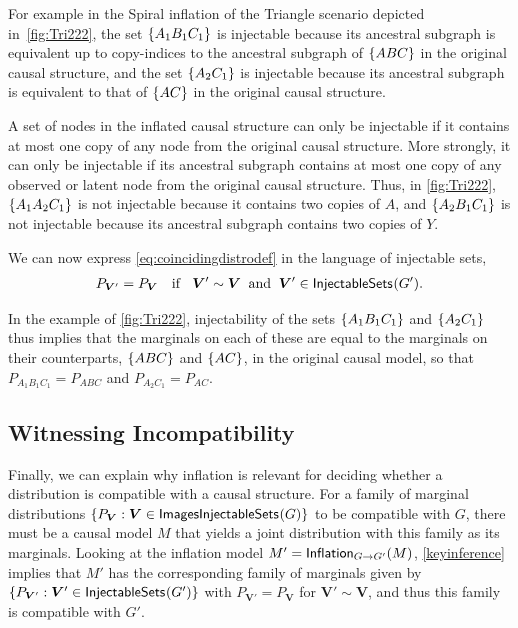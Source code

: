 \documentclass[aps,english,10pt,superscriptaddress,onecolumn,twoside,longbibliography,pra,floatfix,fleqn,nofootinbib]{revtex4-1}
\theoremstyle{definition}
\newcounter{example}[section]
\newcommand{\SmallNamedFunction}[3][]{\operatorname{\mathsf{#2}}_{#1}\parenths{#3}}
\DeclarePairedDelimiter{\parenths}{\lparen}{\rparen}
\DeclarePairedDelimiter{\braces}{\lbrace}{\rbrace}
\newcommand{\brackets}[1]{\braces*{#1}}
\begin{document}
For example in the Spiral inflation of the Triangle scenario depicted in~\cref{fig:Tri222}, the set $\brackets{A_1 B_1 C_1}$ is injectable because its ancestral subgraph is equivalent up to copy-indices to the ancestral subgraph of $\brackets{A B C}$ in the original causal structure, and the set $\brackets{A_2 C_1}$ is injectable because its ancestral subgraph is equivalent to that of $\brackets{ A C}$ in the original causal structure.

A set of nodes in the inflated causal structure can only be injectable if it contains at most one copy of any node from the original causal structure. More strongly, it can only be injectable if its ancestral subgraph contains at most one copy of any observed or latent node from the original causal structure.  
Thus, in \cref{fig:Tri222}, $\brackets{A_1 A_2 C_1}$ is not injectable because it contains two copies of $A$, and $\brackets{A_2 B_1 C_1}$ is not injectable because its ancestral subgraph contains two copies of $Y$. 

We can now express \cref{eq:coincidingdistrodef} in the language of injectable sets,
\begin{align}\label{keyinference}
P_{\bm{V}'}=P_{\bm{V}}\quad\text{if }  \;\; \bm{V}' \sim \bm{V}\;\; \text{and} \;\; \bm{V}'\in\SmallNamedFunction{InjectableSets}{G'}.
\end{align}

In the example of \cref{fig:Tri222}, injectability of the sets $\brackets{A_1 B_1 C_1}$ and $\brackets{A_2 C_1}$ thus implies that the marginals on each of these are equal to the marginals on their counterparts, $\brackets{A B C}$ and $\brackets{A C}$, in the original causal model, so that $P_{A_1 B_1 C_1} = P_{A B C}$ and $P_{A_2 C_1} = P_{A C}$.

\subsection{Witnessing Incompatibility}
\label{subsec:witnessingincompat}

Finally, we can explain why inflation is relevant for deciding whether a distribution is compatible with a causal structure.  For a family of marginal distributions $\{ P_{\bm{V}} : \bm{V} \in \SmallNamedFunction{ImagesInjectableSets}{G}\}$ to be compatible with $G$, there must be a causal model $M$ that yields a joint distribution with this family as its marginals. Looking at the inflation model $M' = \SmallNamedFunction[G\to G']{Inflation}{M}$, \cref{keyinference} implies that $M'$ has the corresponding family of marginals given by $\{ P_{\bm{V}'} : \bm{V}' \in \SmallNamedFunction{InjectableSets}{G'}\}$ with $P_{\bm{V}'} = P_{\bm{V}}$ for $\bm{V}'\sim\bm{V}$, and thus this family is compatible with $G'$.
\end{document}
